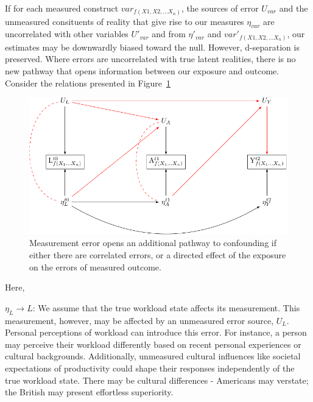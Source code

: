 \documentclass[
  singlecolumn]{report}
\begin{document}
If for each measured construct \(var_{f(X1, X2,\dots X_n)}\), the
sources of error \(U_{var}\) and the unmeasured consituents of reality
that give rise to our measures \(\eta_{var}\) are uncorrelated with
other variables \(U\prime_{var}\) and from \(\eta\prime_{var}\) and
\(var\prime_{f(X1, X2,\dots X_n)}\), our estimates may be downwardly
biased toward the null. However, d-separation is preserved. Where errors
are uncorrelated with true latent realities, there is no new pathway
that opens information between our exposure and outcome. Consider the
relations presented in
Figure~\ref{fig-dag-dep-udir-effect-confounders-3wave}

\begin{figure}

{\centering \includegraphics[width=1\textwidth,height=\textheight]{causal-dags_files/figure-pdf/fig-dag-dep-udir-effect-confounders-3wave-1.pdf}

}

\caption{\label{fig-dag-dep-udir-effect-confounders-3wave}Measurement
error opens an additional pathway to confounding if either there are
correlated errors, or a directed effect of the exposure on the errors of
measured outcome.}

\end{figure}

Here,

\(\eta_L \rightarrow L\): We assume that the true workload state affects
its measurement. This measurement, however, may be affected by an
unmeasured error source, \(U_{L}\). Personal perceptions of workload can
introduce this error. For instance, a person may perceive their workload
differently based on recent personal experiences or cultural
backgrounds. Additionally, unmeasured cultural influences like societal
expectations of productivity could shape their responses independently
of the true workload state. There may be cultural differences -
Americans may verstate; the British may present effortless superiority.
\end{document}
